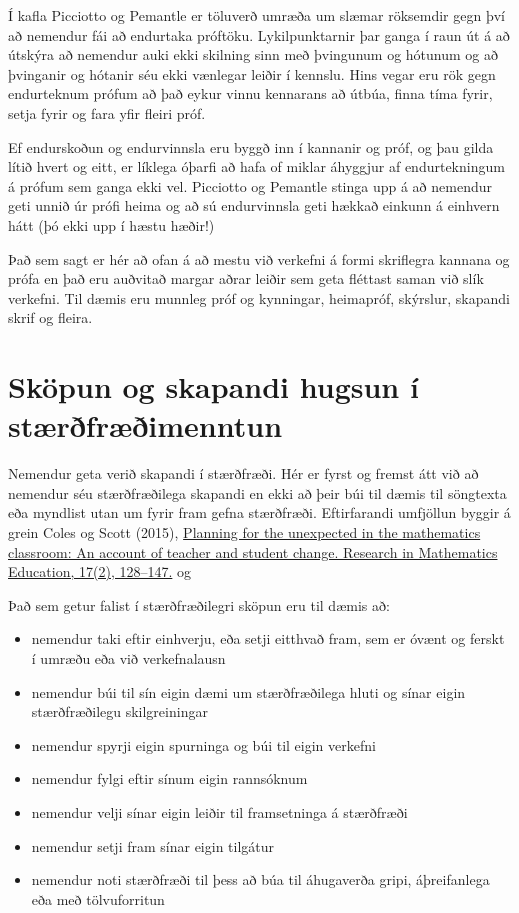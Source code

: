 \documentclass[
  icelandic,
]{book}
\providecommand{\tightlist}{%
  \setlength{\itemsep}{0pt}\setlength{\parskip}{0pt}}
\begin{document}
Í kafla Picciotto og Pemantle er töluverð umræða um slæmar röksemdir gegn því að nemendur fái að endurtaka próftöku. Lykilpunktarnir þar ganga í raun út á að útskýra að nemendur auki ekki skilning sinn með þvingunum og hótunum og að þvinganir og hótanir séu ekki vænlegar leiðir í kennslu. Hins vegar eru rök gegn endurteknum prófum að það eykur vinnu kennarans að útbúa, finna tíma fyrir, setja fyrir og fara yfir fleiri próf.

Ef endurskoðun og endurvinnsla eru byggð inn í kannanir og próf, og þau gilda lítið hvert og eitt, er líklega óþarfi að hafa of miklar áhyggjur af endurtekningum á prófum sem ganga ekki vel. Picciotto og Pemantle stinga upp á að nemendur geti unnið úr prófi heima og að sú endurvinnsla geti hækkað einkunn á einhvern hátt (þó ekki upp í hæstu hæðir!)

Það sem sagt er hér að ofan á að mestu við verkefni á formi skriflegra kannana og prófa en það eru auðvitað margar aðrar leiðir sem geta fléttast saman við slík verkefni. Til dæmis eru munnleg próf og kynningar, heimapróf, skýrslur, skapandi skrif og fleira.

\chapter{Sköpun og skapandi hugsun í stærðfræðimenntun}\label{skopun}

Nemendur geta verið skapandi í stærðfræði. Hér er fyrst og fremst átt við að nemendur séu stærðfræðilega skapandi en ekki að þeir búi til dæmis til söngtexta eða myndlist utan um fyrir fram gefna stærðfræði. Eftirfarandi umfjöllun byggir á grein Coles og Scott (2015), \href{https://doi.org/10.1080/14794802.2015.1047787}{Planning for the unexpected in the mathematics classroom: An account of teacher and student change. Research in Mathematics Education, 17(2), 128--147.} og

Það sem getur falist í stærðfræðilegri sköpun eru til dæmis að:

\begin{itemize}
\tightlist
\item
  nemendur taki eftir einhverju, eða setji eitthvað fram, sem er óvænt og ferskt í umræðu eða við verkefnalausn
\item
  nemendur búi til sín eigin dæmi um stærðfræðilega hluti og sínar eigin stærðfræðilegu skilgreiningar
\item
  nemendur spyrji eigin spurninga og búi til eigin verkefni
\item
  nemendur fylgi eftir sínum eigin rannsóknum
\item
  nemendur velji sínar eigin leiðir til framsetninga á stærðfræði
\item
  nemendur setji fram sínar eigin tilgátur
\item
  nemendur noti stærðfræði til þess að búa til áhugaverða gripi, áþreifanlega eða með tölvuforritun
\end{itemize}
\end{document}
